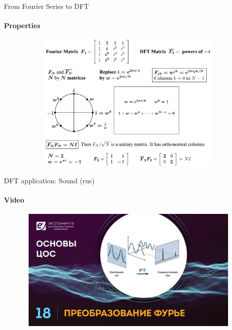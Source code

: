 \documentclass[aspectratio=169]{beamer}
\begin{document}
\begin{frame}[t]{From Fourier Series to DFT}
    \framesubtitle{Properties}
    \vspace{-1.2cm}
    \begin{figure}[H]
        \centering\includegraphics[height=6.8cm,width=1\textwidth,keepaspectratio]{DFT.png}
        \label{fig:DFT.png}
    \end{figure}
    \end{frame}

\begin{frame}[t]{DFT application: Sound (rus)}
    \framesubtitle{Video}
    \vspace{-0.6cm}
    \begin{figure}[H]
        \href{https://youtu.be/T0xlzPBdx6s?t=237}{
            \centering\includegraphics[height=6cm,width=1\textwidth,keepaspectratio]{fft_sound.jpg}}
        \label{fig:fft_sound.jpg}
    \end{figure}
\end{frame}
\end{document}
